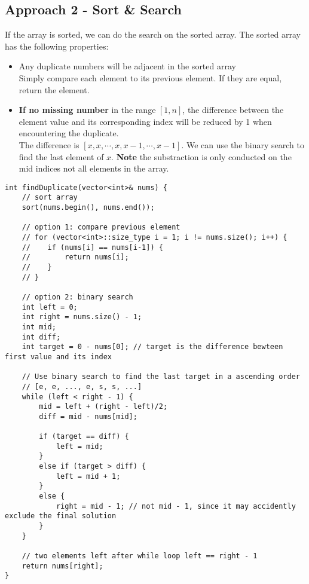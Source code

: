 \documentclass[justified]{tufte-book}
\begin{document}
\subsection{Approach 2 - Sort \& Search}
If the array is sorted, we can do the search on the sorted array. The sorted array has the following properties:
\begin{itemize}
    \item Any duplicate numbers will be adjacent in the sorted array \\
    Simply compare each element to its previous element. If they are equal, return the element. 
    \item \textbf{If no missing number} in the range $[1, n]$, the difference between the element value and its corresponding index will be reduced by 1 when encountering the duplicate. \\
    The difference is $[x, x, \cdots, x, x-1, \cdots, x-1]$. We can use the binary search to find the last element of $x$. \textbf{Note} the substraction is only conducted on the mid indices not all elements in the array. 
\end{itemize}

\begin{lstlisting}
int findDuplicate(vector<int>& nums) {
    // sort array
    sort(nums.begin(), nums.end()); 
    
    // option 1: compare previous element
    // for (vector<int>::size_type i = 1; i != nums.size(); i++) {
    //    if (nums[i] == nums[i-1]) {
    //        return nums[i];
    //    }
    // }
    
    // option 2: binary search
    int left = 0;
    int right = nums.size() - 1;
    int mid;
    int diff;
    int target = 0 - nums[0]; // target is the difference bewteen first value and its index
    
    // Use binary search to find the last target in a ascending order 
    // [e, e, ..., e, s, s, ...]
    while (left < right - 1) {
        mid = left + (right - left)/2;
        diff = mid - nums[mid];
        
        if (target == diff) {
            left = mid;
        }
        else if (target > diff) {
            left = mid + 1; 
        }
        else {
            right = mid - 1; // not mid - 1, since it may accidently exclude the final solution
        }
    }
    
    // two elements left after while loop left == right - 1
    return nums[right];  
}  
\end{lstlisting}
\end{document}
